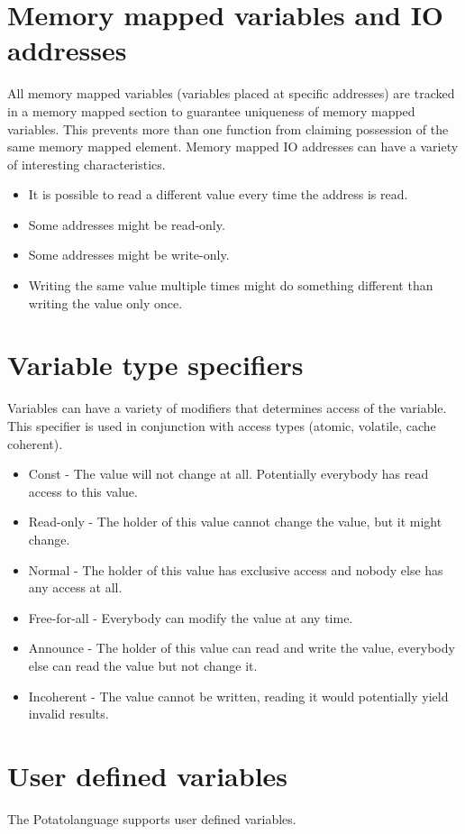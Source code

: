 \documentclass[12pt]{article}
\newcommand{\progLangNameSpace}{Potato\space }
\begin{document}
\section {Memory mapped variables and IO addresses}

All memory mapped variables (variables placed at specific addresses) are tracked in a memory mapped section to guarantee uniqueness of memory mapped variables. This prevents more than one function from claiming possession of the same memory mapped element.
Memory mapped IO addresses can have a variety of interesting characteristics.

\begin{itemize}
\item It is possible to read a different value every time the address is read.
\item Some addresses might be read-only.
\item Some addresses might be write-only.
\item Writing the same value multiple times might do something different than writing the value only once.
\end{itemize}

\section {Variable type specifiers}

Variables can have a variety of modifiers that determines access of the variable. This specifier is used in conjunction with access types (atomic, volatile, cache coherent).
\begin {itemize}
\item Const - The value will not change at all. Potentially everybody has read access to this value.
\item Read-only - The holder of this value cannot change the value, but it might change.
\item Normal - The holder of this value has exclusive access and nobody else has any access at all.
\item Free-for-all - Everybody can modify the value at any time.
\item Announce - The holder of this value can read and write the value, everybody else can read the value but not change it.
\item Incoherent - The value cannot be written, reading it would potentially yield invalid results.
\end {itemize}

\section {User defined variables}
The \progLangNameSpace language supports user defined variables.
\end{document}
